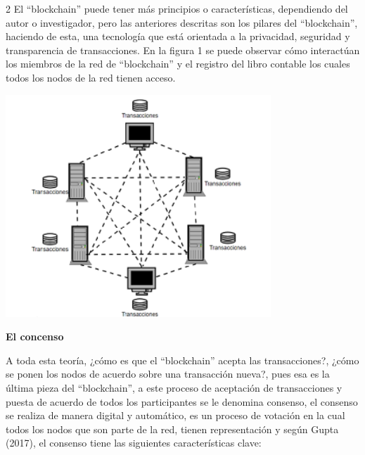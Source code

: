 \documentclass[12pt,spanish,Letterpaper,openany]{book}
\begin{document}
\begin {multicols}{2}
El ``blockchain'' puede tener más principios o características, dependiendo del autor o investigador, pero las anteriores descritas son los pilares del ``blockchain'', haciendo de esta, una tecnología que está orientada a la privacidad, seguridad y transparencia de transacciones. En la figura 1 se puede observar cómo interactúan los miembros de la red de ``blockchain'' y el registro del libro contable los cuales todos los nodos de la red tienen acceso.

\begin {flushleft}
\noindent\begin{minipage}[c]{\columnwidth}
\centering

\includegraphics[width=1\linewidth]{images/kLajpop_image2}

\end{minipage}
\end {flushleft}

\textbf{El concenso}

A toda esta teoría, ¿cómo es que el ``blockchain'' acepta las transacciones?, ¿cómo se ponen los nodos de acuerdo sobre una transacción nueva?, pues esa es la última pieza del ``blockchain'', a este proceso de aceptación de transacciones y puesta de acuerdo de todos los participantes se le denomina consenso, el consenso se realiza de manera digital y automático, es un proceso de votación en la cual todos los nodos que son parte de la red, tienen representación y según Gupta (2017), el consenso tiene las siguientes características clave:


\end{multicols}
\end{document}
